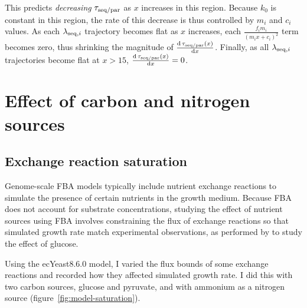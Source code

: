 This predicts \emph{decreasing} $\tau_{\mathrm{seq}/\mathrm{par}}$ as $x$ increases in this region.
Because $k_{0}$ is constant in this region, the rate of this decrease is thus controlled by $m_{i}$ and $c_{i}$ values.
As each $\lambda_{\mathrm{seq},i}$ trajectory becomes flat as $x$ increases, each $\frac{f_{i}m_{i}}{(m_{i}x+c_{i})^{2}}$ term becomes zero, thus shrinking the magnitude of $\frac{\mathrm{d} \, \tau_{\mathrm{seq}/\mathrm{par}}(x)}{\mathrm{d} x}$.
Finally, as all $\lambda_{\mathrm{seq},i}$ trajectories become flat at $x > 15$, $\frac{\mathrm{d} \, \tau_{\mathrm{seq}/\mathrm{par}}(x)}{\mathrm{d} x} = 0$.


\section{Effect of carbon and nitrogen sources}
\label{sec:model-exchange}

\subsection{Exchange reaction saturation}
\label{subsec:model-saturation}

Genome-scale FBA models typically include nutrient exchange reactions to simulate the presence of certain nutrients in the growth medium.
Because FBA does not account for substrate concentrations, studying the effect of nutrient sources using FBA involves constraining the flux of exchange reactions so that simulated growth rate match experimental observations, as performed by \textcite{elsemmanWholecellModelingYeast2022} to study the effect of glucose.

Using the ecYeast8.6.0 model, I varied the flux bounds of some exchange reactions and recorded how they affected simulated growth rate.
I did this with two carbon sources, glucose and pyruvate, and with ammonium as a nitrogen source (figure~\ref{fig:model-saturation}).

